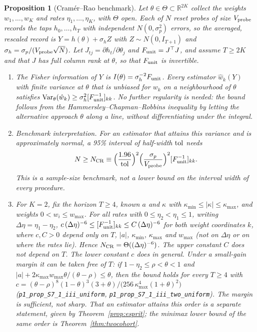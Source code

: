\documentclass[12pt]{article}
\newtheorem{proposition}[theorem]{Proposition}
\theoremstyle{definition}
\theoremstyle{remark}
\newcommand{\R}{\mathbb{R}}
\begin{document}
\begin{proposition}[Cram\'er--Rao benchmark]\label{prop:crb}
Let $\theta\in\Theta\subset\R^{2K}$ collect the weights $w_1,\ldots,w_K$ and rates $\eta_1,\ldots,\eta_K$, with $\Theta$ open. Each of $N$ reset probes of size $V_{\rm probe}$ records the taps $h_0,\ldots,h_T$ with independent $N(0,\sigma_p^2)$ errors, so the averaged, rescaled record is $Y=h(\theta)+\sigma_hZ$ with $Z\sim N(0,I_{T+1})$ and $\sigma_h=\sigma_p/(V_{\rm probe}\sqrt N)$. Let $J_{tj}=\partial h_t/\partial\theta_j$ and $F_{\rm unit}=J^\top J$, and assume $T\ge2K$ and that $J$ has full column rank at $\theta$, so that $F_{\rm unit}$ is invertible.
\begin{enumerate}[label=(\roman*)]
\item The Fisher information of $Y$ is $I(\theta)=\sigma_h^{-2}F_{\rm unit}$. Every estimator $\hat w_k(Y)$ with finite variance at $\theta$ that is unbiased for $w_k$ on a neighbourhood of $\theta$ satisfies ${\rm Var}_\theta(\hat w_k)\ge\sigma_h^2[F_{\rm unit}^{-1}]_{kk}$. No further regularity is needed: the bound follows from the Hammersley--Chapman--Robbins inequality by letting the alternative approach $\theta$ along a line, without differentiating under the integral.
\item \emph{Benchmark interpretation.} For an estimator that attains this variance and is approximately normal, a 95\% interval of half-width ${\rm tol}$ needs
\begin{equation}\label{eq:Ncrb}
N\ge N_{\rm CR}\equiv\Bigl(\frac{1.96}{\rm tol}\Bigr)^2\Bigl(\frac{\sigma_p}{V_{\rm probe}}\Bigr)^2[F_{\rm unit}^{-1}]_{kk}.
\end{equation}
This is a sample-size benchmark, not a lower bound on the interval width of every procedure.
\item For $K=2$, fix the horizon $T\ge4$, known $a$ and $\kappa$ with $\kappa_{\min}\le|\kappa|\le\kappa_{\max}$, and weights $0<w_i\le w_{\max}$. For all rates with $0\le\eta_2<\eta_1\le1$, writing $\Delta\eta=\eta_1-\eta_2$, $c\,(\Delta\eta)^{-6}\le[F_{\rm unit}^{-1}]_{kk}\le C\,(\Delta\eta)^{-6}$ for both weight coordinates $k$, where $c,C>0$ depend only on $T$, $|a|$, $\kappa_{\min}$, $\kappa_{\max}$ and $w_{\max}$ (not on $\Delta\eta$ or on where the rates lie). Hence $N_{\rm CR}=\Theta((\Delta\eta)^{-6})$. The upper constant $C$ does not depend on $T$. The lower constant $c$ does in general. Under a small-gain margin it can be taken free of $T$: if $1-\eta_2\le\rho<\theta<1$ and $|a|+2\kappa_{\max}w_{\max}\theta/(\theta-\rho)\le\theta$, then the bound holds for every $T\ge4$ with $c=(\theta-\rho)^8(1-\theta)^3(3+\theta)/\bigl(256\,\kappa_{\max}^4(1+\theta)^2\bigr)$ (\nolinkurl{p1_prop_S7_1_iii_uniform}, \nolinkurl{p1_prop_S7_1_iii_two_uniform}). The margin is sufficient, not sharp. That an estimator attains this order is a separate statement, given by Theorem~\ref{prop:esprit}; the minimax lower bound of the same order is Theorem~\ref{thm:twocohort}.
\end{enumerate}
\end{proposition}
\end{document}
